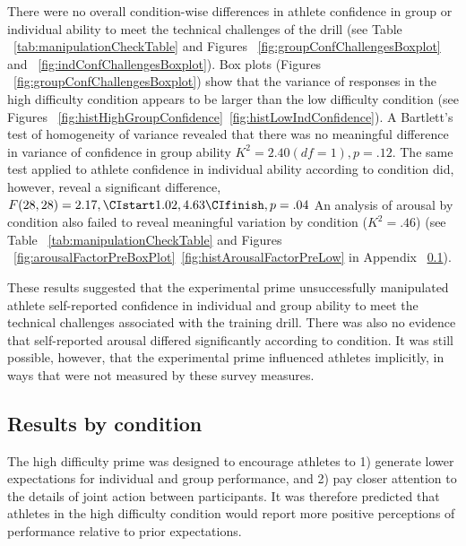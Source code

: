There were no overall condition-wise differences in athlete confidence in group or individual ability to meet the technical challenges of the drill (see Table ~\ref{tab:manipulationCheckTable} and Figures ~\ref{fig:groupConfChallengesBoxplot} and ~\ref{fig:indConfChallengesBoxplot}).
Box plots (Figures ~\ref{fig:groupConfChallengesBoxplot}) show that the variance of responses in the high difficulty condition appears to be larger than the low difficulty condition (see Figures ~\ref{fig:histHighGroupConfidence}\nobreakdash~\ref{fig:histLowIndConfidence}).
A Bartlett's test of homogeneity of variance revealed that there was no meaningful difference in variance of confidence in group ability $K^2 = 2.40 (df = 1), p = .12$.  The same test applied to athlete confidence in individual ability according to condition did, however, reveal a significant difference, $F(28,28) = 2.17, \CIstart 1.02, 4.63 \CIfinish, p = .04$
An analysis of arousal by condition also failed to reveal meaningful variation by condition ($K^2 = .46$) (see Table ~\ref{tab:manipulationCheckTable} and Figures ~\ref{fig:arousalFactorPreBoxPlot}\nobreakdash~\ref{fig:histArousalFactorPreLow} in Appendix ~\ref{}).

These results suggested that the experimental prime unsuccessfully
manipulated athlete self-reported confidence in individual and group ability to meet the technical challenges associated with the training drill.  There was also no evidence that self-reported arousal differed significantly according to condition. It was still possible, however, that the experimental prime influenced athletes implicitly, in ways that were not measured by these survey measures.


\subsection{Results by condition}
The high difficulty prime was designed to encourage athletes to 1) generate lower expectations for individual and group performance, and 2) pay closer attention to the details of joint action between participants.  It was therefore predicted that athletes in the high difficulty condition would report more positive perceptions of performance relative to prior expectations.


